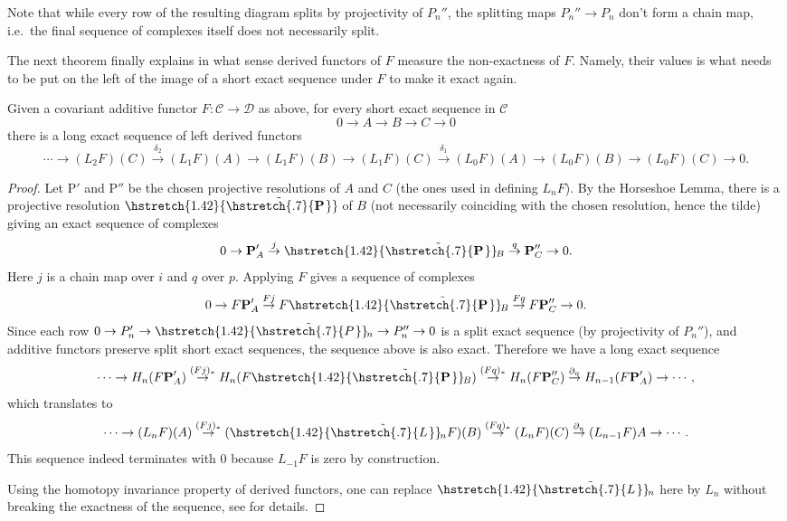 \documentclass[english,letterpaper]{article}%
\numberwithin{equation}{section}
\numberwithin{figure}{section}
\numberwithin{table}{section}
\theoremstyle{definition}
\theoremstyle{definition}
\theoremstyle{definition}
\theoremstyle{plain}
\theoremstyle{plain}
\theoremstyle{plain}
\theoremstyle{plain}
\theoremstyle{remark}
\theoremstyle{remark}
\newcommand{\calC}{\mathcal{C}}
\newcommand{\calD}{\mathcal{D}}
\newcommand{\bm}[1]{\boldsymbol{\mathrm{#1}}}
\newcommand\wt[1]{\hstretch{1.42}{\tilde{\hstretch{.7}{#1\mkern2mu}}}\mkern-2mu}
\begin{document}
\begin{rem}
    Note that while every row of the resulting diagram splits by projectivity of $P_n''$, the splitting maps $P_n''\to P_n$ don't form a chain map, i.e.\ the final sequence of complexes itself does not necessarily split.
\end{rem}

The next theorem finally explains in what sense derived functors of $F$ measure the non-exactness of $F$. Namely, their values is what needs to be put on the left of the image of a short exact sequence under $F$ to make it exact again.

\begin{thm}
    Given a covariant additive functor $F:\calC\to\calD$ as above, for every short exact sequence in $\calC$
    \[0\to A\to B\to C\to 0\]
    there is a long exact sequence of left derived functors
    \[\cdots \to (L_2 F)(C)\overset{\delta_2}\to (L_1 F)(A)\to (L_1 F)(B)\to (L_1 F)(C)\overset{\delta_1}\to (L_0 F)(A)\to (L_0 F)(B)\to (L_0 F)(C)\to 0.\]
\end{thm}
\begin{proof}
     Let $\bm{P}'$ and $\bm{P}''$ be the chosen projective resolutions of $A$ and $C$ (the ones used in defining $L_nF$). By the Horseshoe Lemma, there is a projective resolution $\wt{\bm{P}}$ of $B$ (not necessarily coinciding with the chosen resolution, hence the tilde) giving an exact sequence of complexes
     \[0\to \bm{P}'_{A}\overset j\to \wt{\bm{P}}_B \overset q\to \bm{P}''_{C}\to 0.\]
     Here $j$ is a chain map over $i$ and $q$ over $p$. Applying $F$ gives a sequence of complexes 
     \[0\to F\bm{P}'_{A}\overset {Fj}\to F\wt{\bm{P}}_B \overset {Fq}\to F\bm{P}''_{C}\to 0.\]
     Since each row $0\to P_n' \to \wt{P}_n\to P_n''\to 0$ is a split exact sequence (by projectivity of $P_{n}''$), and additive functors preserve split short exact sequences, the sequence above is also exact. Therefore we have a long exact sequence
     \[\cdots\to H_n(F\bm{P}'_{A})\overset{(Fj)_\ast}\to H_n(F\wt{\bm{P}}_B) \overset {(Fq)_\ast}\to H_n(F\bm{P}''_{C})\overset{\partial_n}\to H_{n-1}(F\bm{P}'_{A})\to \cdots,\]
     which translates to
     \[\cdots\to (L_nF)(A)\overset{(Fj)_\ast}\to (\wt{L}_n F)(B)\overset{(Fq)_\ast}\to (L_nF)(C)\overset{\partial_n}\to (L_{n-1}F)A\to \cdots. \]
     This sequence indeed terminates with $0$ because $L_{-1}F$ is zero by construction.
     
     Using the homotopy invariance property of derived functors, one can replace $\wt{L}_n$ here by $L_n$ without breaking the exactness of the sequence, see \cite[Thm. 6.27]{Rotman} for details.
\end{proof}
\end{document}
